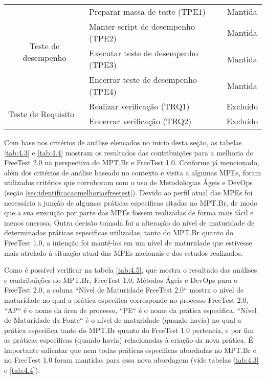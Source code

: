 \begin{table}[H]
\begin{tabular}{|c|l|c|}
\multirow{4}{*}{Teste de desempenho}                      & Preparar massa de teste (TPE1)                   & Mantida                       \\ \cline{2-3} 
                                                          & Manter script de desempenho (TPE2)               & Mantida                       \\ \cline{2-3} 
                                                          & Executar teste de desempenho (TPE3)              & Mantida                       \\ \cline{2-3} 
                                                          & Encerrar teste de desempenho (TPE4)              & Mantida                       \\ \hline
\multicolumn{1}{|l|}{\multirow{2}{*}{Teste de Requisito}} & Realizar verificação (TRQ1)                      & \multicolumn{1}{l|}{Excluído} \\ \cline{2-3} 
\multicolumn{1}{|l|}{}                                    & Encerrar verificação (TRQ2)                      & \multicolumn{1}{l|}{Excluído} \\ \hline
\end{tabular}
\end{table}

Com base nos critérios de análise elencados no inicio desta seção, as tabelas \ref{tab:4.3} e \ref{tab:4.4} mostram os resultados das contribuições para a melhoria do FreeTest 2.0 na perspectiva do MPT.Br e FreeTest 1.0. Conforme já mencionado, além dos critérios de análise baseado no contexto e visita a algumas MPEs, foram utilizados critérios que corroboram com o uso de Metodologias Ágeis e DevOps (seção \ref{sec:identificacaomelhoriasfreetest}). Devido ao perfil atual das MPEs foi necessário a junção de algumas práticas especificas citadas no MPT.Br, de modo que a sua execução por parte das MPEs fossem realizadas de forma mais fácil e menos onerosa. Outra decisão tomada foi a alteração do nível de maturidade de determinadas práticas especificas utilizadas, tanto do MPT.Br quanto do FreeTest 1.0, a intenção foi mantê-los em um nível de maturidade que estivesse mais atrelado à situação atual das MPEs nacionais \cite{Especialistas2015, SilvaDias2015} e dos estudos realizados.

Como é possível verificar na tabela \ref{tab:4.5}, que mostra o resultado das análises e contribuições do MPT.Br, FreeTest 1.0, Métodos Ágeis e DevOps para o FreeTest 2.0, a coluna “Nível de Maturidade FreeTest 2.0“ mostra o nível de maturidade no qual a prática especifica corresponde no processo FreeTest 2.0, “AP“ é o nome da área de processo, “PE“ é o nome da prática especifica, “Nível de Maturidade da Fonte“ é o nível de maturidade (quando havia) no qual a prática especifica tanto do MPT.Br quanto do FreeTest 1.0 pertencia, e por fim as práticas especificas (quando havia) relacionadas à criação da nova prática. É importante salientar que nem todas práticas especificas abordadas no MPT.Br e no FreeTest 1.0 foram mantidas para essa nova abordagem (vide tabelas \ref{tab:4.3} e \ref{tab:4.4}).

